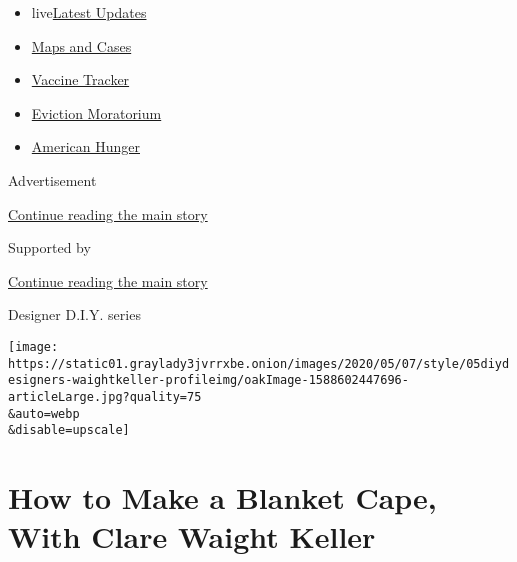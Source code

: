 \begin{itemize}
\tightlist
\item
  live\href{https://www.nytimes3xbfgragh.onion/2020/09/08/world/covid-19-coronavirus.html?name=styln-coronavirus-national\&region=TOP_BANNER\&block=storyline_menu_recirc\&action=click\&pgtype=Article\&impression_id=c75236c1-f279-11ea-b3ae-754b2373ddeb\&variant=undefined}{Latest
  Updates}
\item
  \href{https://www.nytimes3xbfgragh.onion/interactive/2020/us/coronavirus-us-cases.html?name=styln-coronavirus-national\&region=TOP_BANNER\&block=storyline_menu_recirc\&action=click\&pgtype=Article\&impression_id=c75236c2-f279-11ea-b3ae-754b2373ddeb\&variant=undefined}{Maps
  and Cases}
\item
  \href{https://www.nytimes3xbfgragh.onion/interactive/2020/science/coronavirus-vaccine-tracker.html?name=styln-coronavirus-national\&region=TOP_BANNER\&block=storyline_menu_recirc\&action=click\&pgtype=Article\&impression_id=c75236c3-f279-11ea-b3ae-754b2373ddeb\&variant=undefined}{Vaccine
  Tracker}
\item
  \href{https://www.nytimes3xbfgragh.onion/2020/09/02/your-money/eviction-moratorium-covid.html?name=styln-coronavirus-national\&region=TOP_BANNER\&block=storyline_menu_recirc\&action=click\&pgtype=Article\&impression_id=c75236c4-f279-11ea-b3ae-754b2373ddeb\&variant=undefined}{Eviction
  Moratorium}
\item
  \href{https://www.nytimes3xbfgragh.onion/interactive/2020/09/02/magazine/food-insecurity-hunger-us.html?name=styln-coronavirus-national\&region=TOP_BANNER\&block=storyline_menu_recirc\&action=click\&pgtype=Article\&impression_id=c75236c5-f279-11ea-b3ae-754b2373ddeb\&variant=undefined}{American
  Hunger}
\end{itemize}

Advertisement

\protect\hyperlink{after-top}{Continue reading the main story}

Supported by

\protect\hyperlink{after-sponsor}{Continue reading the main story}

Designer D.I.Y. series

\texttt{[image: https://static01.graylady3jvrrxbe.onion/images/2020/05/07/style/05diydesigners-waightkeller-profileimg/oakImage-1588602447696-articleLarge.jpg?quality=75\\\&auto=webp\\\&disable=upscale]}

\hypertarget{how-to-make-a-blanket-cape-with-clare-waight-keller}{%
\section{How to Make a Blanket Cape, With Clare Waight
Keller}\label{how-to-make-a-blanket-cape-with-clare-waight-keller}}

